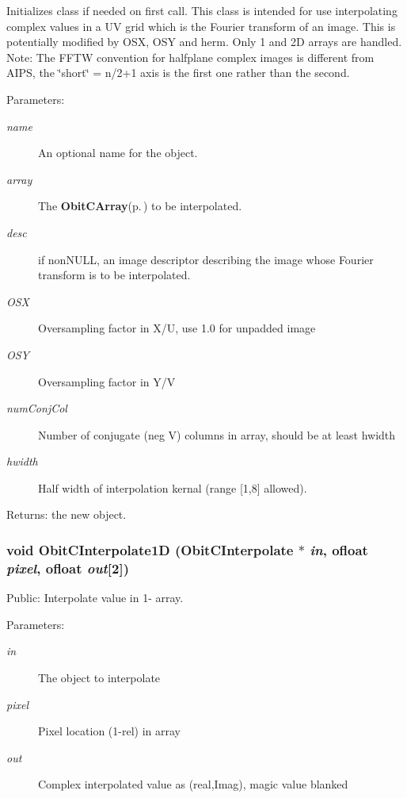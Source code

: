 Initializes class if needed on first call. This class is intended for use interpolating complex values in a UV grid which is the Fourier transform of an image. This is potentially modified by OSX, OSY and herm. Only 1 and 2D arrays are handled. Note: The FFTW convention for halfplane complex images is different from AIPS, the \char`\"{}short\char`\"{} = n/2+1 axis is the first one rather than the second. \begin{Desc}
\item[Parameters:]
\begin{description}
\item[{\em name}]An optional name for the object. \item[{\em array}]The {\bf Obit\-CArray}{\rm (p.\,\pageref{structObitCArray})} to be interpolated. \item[{\em desc}]if non\-NULL, an image descriptor describing the image whose Fourier transform is to be interpolated. \item[{\em OSX}]Oversampling factor in X/U, use 1.0 for unpadded image \item[{\em OSY}]Oversampling factor in Y/V \item[{\em num\-Conj\-Col}]Number of conjugate (neg V) columns in array, should be at least hwidth \item[{\em hwidth}]Half width of interpolation kernal (range [1,8] allowed). \end{description}
\end{Desc}
\begin{Desc}
\item[Returns:]the new object. \end{Desc}
\subsubsection{\setlength{\rightskip}{0pt plus 5cm}void Obit\-CInterpolate1D ({\bf Obit\-CInterpolate} $\ast$ {\em in}, {\bf ofloat} {\em pixel}, {\bf ofloat} {\em out}[2])}\label{ObitCInterpolate_8h_a11}


Public: Interpolate value in 1- array. 

\begin{Desc}
\item[Parameters:]
\begin{description}
\item[{\em in}]The object to interpolate \item[{\em pixel}]Pixel location (1-rel) in array \item[{\em out}]Complex interpolated value as (real,Imag), magic value blanked \end{description}
\end{Desc}
